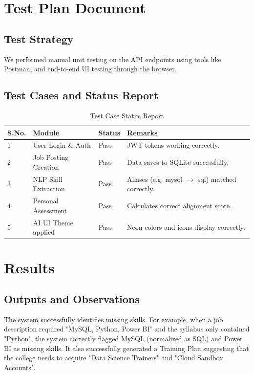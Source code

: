 \documentclass[12pt,a4paper]{report}
\begin{document}
\chapter{Test Plan Document}

\section{Test Strategy}
We performed manual unit testing on the API endpoints using tools like Postman, and end-to-end UI testing through the browser.

\section{Test Cases and Status Report}
\begin{table}[H]
\centering
\begin{tabular}{|l|l|l|l|}
\hline
\textbf{S.No.} & \textbf{Module} & \textbf{Status} & \textbf{Remarks} \\
\hline
1 & User Login \& Auth & Pass & JWT tokens working correctly. \\
\hline
2 & Job Posting Creation & Pass & Data saves to SQLite successfully. \\
\hline
3 & NLP Skill Extraction & Pass & Aliases (e.g. mysql $\rightarrow$ sql) matched correctly. \\
\hline
4 & Personal Assessment & Pass & Calculates correct alignment score. \\
\hline
5 & AI UI Theme applied & Pass & Neon colors and icons display correctly. \\
\hline
\end{tabular}
\caption{Test Case Status Report}
\end{table}

\chapter{Results}

\section{Outputs and Observations}
The system successfully identifies missing skills. For example, when a job description required "MySQL, Python, Power BI" and the syllabus only contained "Python", the system correctly flagged MySQL (normalized as SQL) and Power BI as missing skills. It also successfully generated a Training Plan suggesting that the college needs to acquire "Data Science Trainers" and "Cloud Sandbox Accounts".
\end{document}
